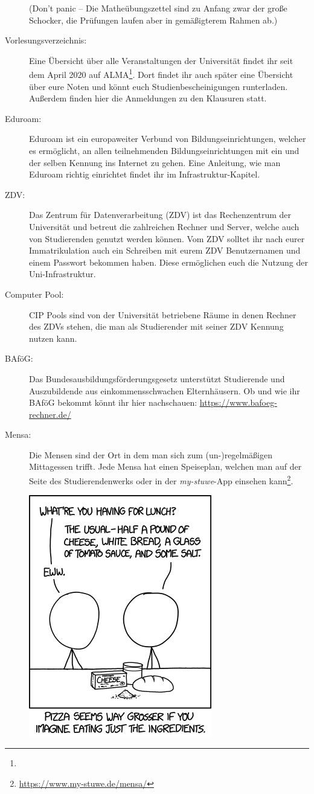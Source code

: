 \begin{description}
(Don't panic -- Die Matheübungszettel sind zu Anfang zwar der gro\ss e
  Schocker, die Prüfungen laufen aber in gemä\ss igterem Rahmen ab.)

\item [Vorlesungsverzeichnis:] Eine Übersicht über alle Veranstaltungen der Universität findet ihr seit dem April 2020 auf ALMA\footnote{}. Dort findet ihr auch später eine Übersicht über eure Noten und könnt euch Studienbescheinigungen runterladen.
Außerdem finden hier die Anmeldungen zu den Klausuren statt.
 
\item [Eduroam:] Eduroam ist ein europaweiter Verbund von Bildungseinrichtungen, welcher es ermöglicht, an allen teilnehmenden Bildungseinrichtungen mit ein und der selben Kennung ins Internet zu gehen.
Eine Anleitung, wie man Eduroam richtig einrichtet findet ihr im Infrastruktur-Kapitel.

\item [ZDV:] Das Zentrum für Datenverarbeitung (ZDV) ist das Rechenzentrum der Universität und betreut die zahlreichen Rechner und Server, welche auch von Studierenden genutzt werden können. Vom ZDV solltet ihr nach eurer Immatrikulation auch ein Schreiben mit eurem ZDV Benutzernamen und einem Passwort bekommen haben. Diese ermöglichen euch die Nutzung der Uni-Infrastruktur.

\item [Computer Pool:] CIP Pools sind von der Universität betriebene Räume in denen Rechner des ZDVs stehen, die man als Studierender mit seiner ZDV Kennung nutzen kann.

\item[BAföG:] Das Bundesausbildungsförderungsgesetz unterstützt Studierende und Auszubildende aus einkommensschwachen Elternhäusern. Ob und wie ihr BAföG bekommt könnt ihr hier nachschauen: \url{https://www.bafoeg-rechner.de/}	%

\item[Mensa:] Die Mensen sind der Ort in dem man sich zum (un-)regelmäßigen Mittagessen trifft. Jede Mensa hat einen Speiseplan, welchen man auf der Seite des Studierendenwerks oder in der \emph{my-stuwe}-App einsehen kann\footnote{\url{https://www.my-stuwe.de/mensa/}}.	%

\vfill

\begin{center}
\includegraphics[width=0.35\hsize]{info/xkcd/lunch.png}
\end{center}

\pagebreak

\end{description}
